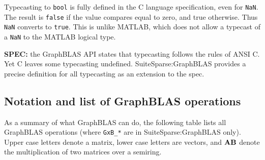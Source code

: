 \documentclass[12pt]{article}
\begin{document}
Typecasting to \verb'bool' is fully defined in the C language specification,
even for \verb'NaN'.  The result is \verb'false' if the value compares equal to
zero, and true otherwise.  Thus \verb'NaN' converts to \verb'true'.  This is
unlike MATLAB, which does not allow a typecast of a \verb'NaN' to the MATLAB
logical type.

\begin{spec}
{\bf SPEC:} the GraphBLAS API states that typecasting follows the rules of ANSI
C.  Yet C leaves some typecasting undefined.  SuiteSparse:GraphBLAS provides a
precise definition for all typecasting as an extension to the spec.
\end{spec}

\subsection{Notation and list of GraphBLAS operations} %
\label{list}

As a summary of what GraphBLAS can do, the following table lists all GraphBLAS
operations (where \verb'GxB_*' are in SuiteSparse:GraphBLAS only).  Upper case
letters denote a matrix, lower case letters are vectors, and ${\bf AB}$
denote the multiplication of two matrices over a semiring.
\end{document}
